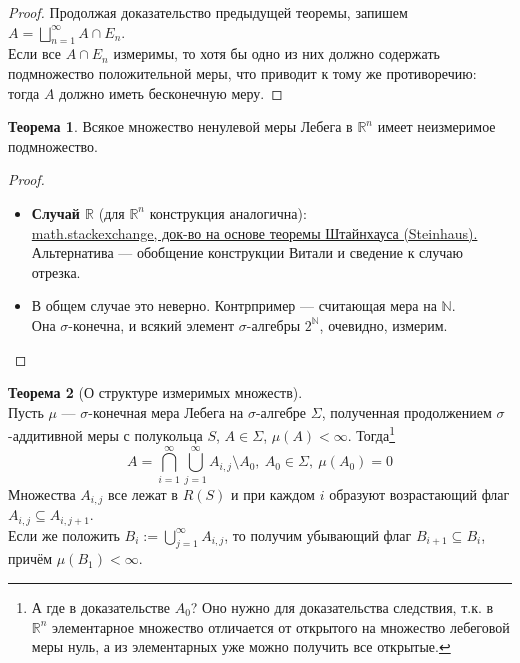 \documentclass[11pt,a4paper]{report}
\def\Real{\mathbb{R}}
\def\Natural{\mathbb{N}}
\theoremstyle{definition}
\theoremstyle{definition}
\newtheorem{theorem}{Теорема}[section]
\theoremstyle{definition}
\begin{document}
	\begin{proof}
		Продолжая доказательство предыдущей теоремы, запишем $ A = \bigsqcup_{n=1}^{\infty} A \cap E_{n} $.\\
		Если все $ A \cap E_{n} $ измеримы, то хотя бы одно из них должно содержать подмножество положительной меры, что приводит к тому же противоречию: тогда $ A $ должно иметь бесконечную меру.
	\end{proof}
	\begin{theorem}
		Всякое множество ненулевой меры Лебега в $ \Real^{n} $ имеет неизмеримое подмножество.
	\end{theorem}
	\begin{proof}$  $
			\begin{itemize}
				\item \textbf{Случай $ \Real $} (для $ \Real^{n} $ конструкция аналогична):\\ \href{https://math.stackexchange.com/questions/84491/does-the-set-of-differences-of-a-lebesgue-measurable-set-contains-elements-of-at/104126#104126}{math.stackexchange, док-во на основе теоремы Штайнхауса (Steinhaus).}\\
				Альтернатива — обобщение конструкции Витали и сведение к случаю отрезка.
				\item В общем случае это неверно. Контрпример — считающая мера на $ \Natural $.\\
				Она $ \sigma $-конечна, и всякий элемент $ \sigma $-алгебры $ 2^{\Natural} $, очевидно, измерим.
			\end{itemize}
	\end{proof}
	\begin{theorem}[О структуре измеримых множеств]$  $\\
		Пусть $ \mu $ — $ \sigma $-конечная мера Лебега на $ \sigma $-алгебре $ \Sigma $, полученная продолжением $ \sigma $-аддитивной меры с полукольца $ S $, $ A \in \Sigma $, $ \mu(A) < \infty $. Тогда\footnote{А где в доказательстве $ A_{0} $? Оно нужно для доказательства следствия, т.к. в $ \Real^{n} $ элементарное множество отличается от открытого на множество лебеговой меры нуль, а из элементарных уже можно получить все открытые.}
		\[ 
			A = \bigcap\limits_{i=1}^{\infty}{\bigcup\limits_{j=1}^{\infty}{A_{i, j}} \setminus A_{0}},\ A_{0} \in \Sigma,\ \mu(A_{0}) = 0 
		\]
		Множества $ A_{i, j} $  все лежат в $ R(S) $ и при каждом $ i $ образуют возрастающий флаг $ A_{i, j} \subseteq A_{i, j+1} $.\\
		Если же положить $ B_{i} := \bigcup\limits_{j=1}^{\infty}{A_{i, j}} $, то получим убывающий флаг $ B_{i+1} \subseteq B_{i}  $, причём $ \mu(B_{1}) < \infty $.
	\end{theorem}
\end{document}
